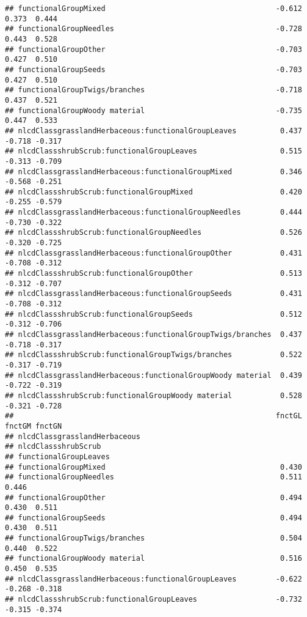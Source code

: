 \documentclass[]{article}
\begin{document}
\begin{verbatim}
## functionalGroupMixed                                       -0.612  0.373  0.444
## functionalGroupNeedles                                     -0.728  0.443  0.528
## functionalGroupOther                                       -0.703  0.427  0.510
## functionalGroupSeeds                                       -0.703  0.427  0.510
## functionalGroupTwigs/branches                              -0.718  0.437  0.521
## functionalGroupWoody material                              -0.735  0.447  0.533
## nlcdClassgrasslandHerbaceous:functionalGroupLeaves          0.437 -0.718 -0.317
## nlcdClassshrubScrub:functionalGroupLeaves                   0.515 -0.313 -0.709
## nlcdClassgrasslandHerbaceous:functionalGroupMixed           0.346 -0.568 -0.251
## nlcdClassshrubScrub:functionalGroupMixed                    0.420 -0.255 -0.579
## nlcdClassgrasslandHerbaceous:functionalGroupNeedles         0.444 -0.730 -0.322
## nlcdClassshrubScrub:functionalGroupNeedles                  0.526 -0.320 -0.725
## nlcdClassgrasslandHerbaceous:functionalGroupOther           0.431 -0.708 -0.312
## nlcdClassshrubScrub:functionalGroupOther                    0.513 -0.312 -0.707
## nlcdClassgrasslandHerbaceous:functionalGroupSeeds           0.431 -0.708 -0.312
## nlcdClassshrubScrub:functionalGroupSeeds                    0.512 -0.312 -0.706
## nlcdClassgrasslandHerbaceous:functionalGroupTwigs/branches  0.437 -0.718 -0.317
## nlcdClassshrubScrub:functionalGroupTwigs/branches           0.522 -0.317 -0.719
## nlcdClassgrasslandHerbaceous:functionalGroupWoody material  0.439 -0.722 -0.319
## nlcdClassshrubScrub:functionalGroupWoody material           0.528 -0.321 -0.728
##                                                            fnctGL fnctGM fnctGN
## nlcdClassgrasslandHerbaceous                                                   
## nlcdClassshrubScrub                                                            
## functionalGroupLeaves                                                          
## functionalGroupMixed                                        0.430              
## functionalGroupNeedles                                      0.511  0.446       
## functionalGroupOther                                        0.494  0.430  0.511
## functionalGroupSeeds                                        0.494  0.430  0.511
## functionalGroupTwigs/branches                               0.504  0.440  0.522
## functionalGroupWoody material                               0.516  0.450  0.535
## nlcdClassgrasslandHerbaceous:functionalGroupLeaves         -0.622 -0.268 -0.318
## nlcdClassshrubScrub:functionalGroupLeaves                  -0.732 -0.315 -0.374

\end{verbatim}
\end{document}

